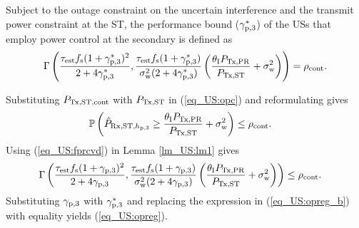 \begin{coro} \label{cor_US:cor1}
\normalfont
Subject to the outage constraint on the uncertain interference and the transmit power constraint at the ST, the performance bound (${\gamma}_{\text{p,3}}^*$) of the USs that employ power control at the secondary is defined as %
\begin{align}
\Gamma\left(\frac{\tau_{\text{est}} f_{\text{s}} (1 + {\gamma}_{\text{p,3}}^*)^2}{2 + 4 {\gamma}_{\text{p,3}}^*}, \frac{\tau_{\text{est}} f_{\text{s}} (1  + {\gamma}_{\text{p,3}}^*)}{\sigma^2_{\text{w}} (2 + 4 {\gamma}_{\text{p,3}}^*)} \left( \frac{\theta_{\text{I}} P_{\text{Tx,PR}}}{P_{\text{Tx,ST}}} + \sigma^2_{\text{w}}  \right)  \right) = \rho_{\text{cont}}. \label{eq_US:opreg}  
\end{align}
\end{coro}
\begin{IEEEproof}
Substituting $P_{\text{Tx,ST,cont}}$ with $P_{\text{Tx,ST}}$ in (\ref{eq_US:opc}) and reformulating gives 
\begin{align}
\mathbb P\left( \hat{P}_{\text{Rx,ST,$h_{\text{p,3}}$}} \ge \frac{\theta_{\text{I}} P_{\text{Tx,PR}}}{P_{\text{Tx,ST}}} + \sigma^2_{\text{w}} \right) &\le \rho_{\text{cont}}. \label{eq_US:opreg_a} 
\end{align}
Using (\ref{eq_US:fprcvd}) in Lemma \ref{lm_US:lm1} gives
\begin{align}
\Gamma\left(\frac{\tau_{\text{est}} f_{\text{s}} (1 + {\gamma}_{\text{p,3}})^2}{2 + 4 {\gamma}_{\text{p,3}}}, \frac{\tau_{\text{est}} f_{\text{s}} (1  + {\gamma}_{\text{p,3}})}{\sigma^2_{\text{w}} (2 + 4 {\gamma}_{\text{p,3}})} \left( \frac{\theta_{\text{I}} P_{\text{Tx,PR}}}{P_{\text{Tx,ST}}} + \sigma^2_{\text{w}}  \right)  \right) &\le \rho_{\text{cont}}. \label{eq_US:opreg_b} 
\end{align}
Substituting ${\gamma}_{\text{p,3}}$ with ${\gamma}_{\text{p,3}}^*$ and replacing the expression in (\ref{eq_US:opreg_b}) with equality yields (\ref{eq_US:opreg}). 
\end{IEEEproof}
